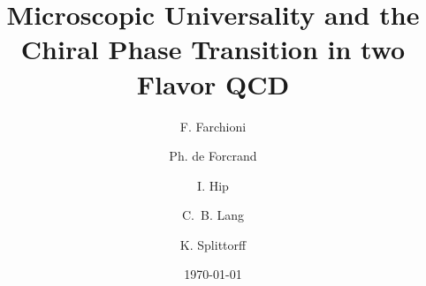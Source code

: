 %






\title{Microscopic Universality and the Chiral Phase Transition
in two Flavor QCD}

\author{F. Farchioni}
\address{Deutsches Elektronen-Synchrotron DESY, Notkestr. 85, D-22603 Hamburg,
Germany}
\author{\vspace{-1mm}Ph. de Forcrand}
\address{Institut f{\"u}r Theoretische Physik, 
ETH-H\"onggerberg, CH-8093 Z{\"u}rich, Switzerland}
\author{\vspace{-1mm}I. Hip}
\address{NIC - John von Neumann Institute for Computing,
FZ-J{\"u}lich, D-52425 J{\"u}lich, Germany}
\author{\vspace{-1mm}C.~B. Lang}
\address{Institut f{\"u}r Theoretische Physik,
Karl-Franzens-Universit\"at Graz, A-8010 Graz, Austria}
\author{\vspace{-1mm}K. Splittorff}   
\address{The Niels Bohr Institute, Blegdamsvej 17, DK-2100 Copenhagen \O, Denmark} 
\date{\today} 
\maketitle

